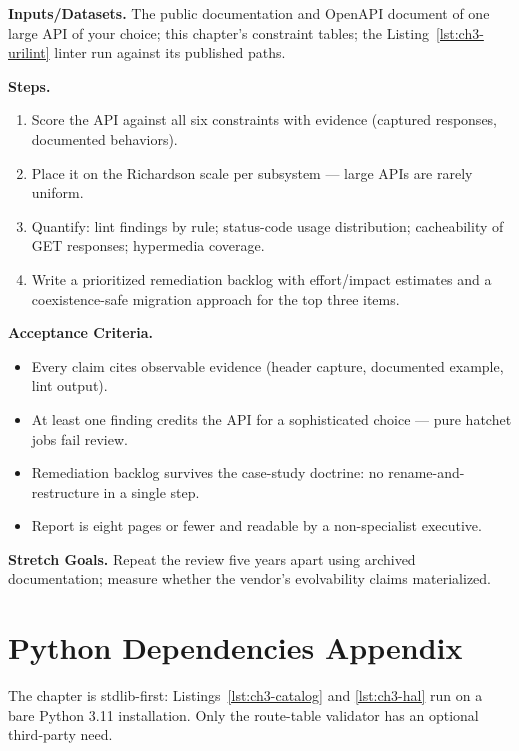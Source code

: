 \textbf{Inputs/Datasets.} The public documentation and OpenAPI document of one
large API of your choice; this chapter's constraint tables; the
Listing~\ref{lst:ch3-urilint} linter run against its published paths.

\textbf{Steps.}
\begin{enumerate}
  \item Score the API against all six constraints with evidence (captured
        responses, documented behaviors).
  \item Place it on the Richardson scale per subsystem --- large APIs are
        rarely uniform.
  \item Quantify: lint findings by rule; status-code usage distribution;
        cacheability of GET responses; hypermedia coverage.
  \item Write a prioritized remediation backlog with effort/impact estimates
        and a coexistence-safe migration approach for the top three items.
\end{enumerate}

\textbf{Acceptance Criteria.}
\begin{itemize}
  \item[$\square$] Every claim cites observable evidence (header capture,
        documented example, lint output).
  \item[$\square$] At least one finding credits the API for a sophisticated
        choice --- pure hatchet jobs fail review.
  \item[$\square$] Remediation backlog survives the case-study doctrine: no
        rename-and-restructure in a single step.
  \item[$\square$] Report is eight pages or fewer and readable by a
        non-specialist executive.
\end{itemize}

\textbf{Stretch Goals.} Repeat the review five years apart using archived
documentation; measure whether the vendor's evolvability claims materialized.

\section{Python Dependencies Appendix}
\label{sec:ch3-dependencies}

The chapter is stdlib-first: Listings~\ref{lst:ch3-catalog} and
\ref{lst:ch3-hal} run on a bare Python 3.11 installation. Only the route-table
validator has an optional third-party need.

